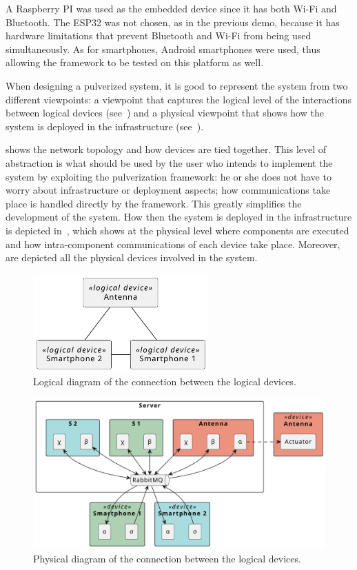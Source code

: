 A Raspberry PI was used as the embedded device since it has both Wi-Fi and Bluetooth. The ESP32 was not chosen, as in the previous demo, because it
has hardware limitations that prevent Bluetooth and Wi-Fi from being used simultaneously. As for smartphones, Android smartphones were used, thus
allowing the framework to be tested on this platform as well.

When designing a pulverized system, it is good to represent the system from two different viewpoints: a viewpoint that captures the logical level
of the interactions between logical devices (see~) and a physical viewpoint that shows how the system is deployed in
the infrastructure (see~).

 shows the network topology and how devices are tied together. This level of abstraction is what should be used by
the user who intends to implement the system by exploiting the pulverization framework: he or she does not have to worry about infrastructure or
deployment aspects; how communications take place is handled directly by the framework. This greatly simplifies the development of the system. How
then the system is deployed in the infrastructure is depicted in~, which shows at the physical level where
components are executed and how intra-component communications of each device take place. Moreover, are depicted all the physical devices involved in
the system.

\begin{figure}[ht]
	\centering
	\includegraphics[width=0.6\textwidth]{figures/demo2-logical-device.pdf}
	\caption{Logical diagram of the connection between the logical devices.}
	\label{fig:demo-2-logical-diagram}
\end{figure}

\begin{figure}[ht]
	\centering
	\includegraphics[width=\textwidth]{figures/demo2-physical.pdf}
	\caption{Physical diagram of the connection between the logical devices.}
	\label{fig:demo-2-physical-diagram}
\end{figure}

